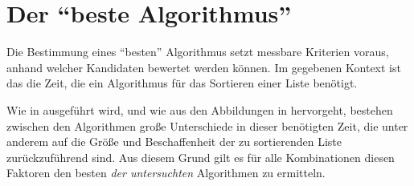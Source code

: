 
\section{Der \enquote{beste Algorithmus}}
\label{sec:best-algo}

Die Bestimmung eines \enquote{besten} Algorithmus setzt messbare Kriterien voraus, anhand welcher Kandidaten bewertet werden können. Im gegebenen Kontext ist das die Zeit, die ein Algorithmus für das Sortieren einer Liste benötigt.

Wie in  ausgeführt wird, und wie aus den Abbildungen in  hervorgeht, bestehen zwischen den Algorithmen große Unterschiede in dieser benötigten Zeit, die unter anderem auf die Größe und Beschaffenheit der zu sortierenden Liste zurückzuführend sind. Aus diesem Grund gilt es für alle Kombinationen diesen Faktoren den besten \emph{der untersuchten} Algorithmen zu ermitteln.

